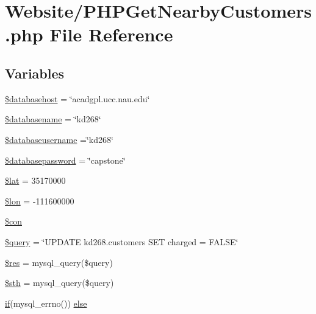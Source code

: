 \hypertarget{_p_h_p_get_nearby_customers_8php}{\section{Website/\-P\-H\-P\-Get\-Nearby\-Customers.php File Reference}
\label{_p_h_p_get_nearby_customers_8php}
}
\subsection*{Variables}
\begin{DoxyCompactItemize}
\item 
\hyperlink{_p_h_p_get_nearby_customers_8php_a034ead57b6864a4413371711e8d65372}{\$databasehost} = \char`\"{}acadgpl.\-ucc.\-nau.\-edu\char`\"{}
\item 
\hyperlink{_p_h_p_get_nearby_customers_8php_aace53f8afce81b52040cef0cd850138a}{\$databasename} = \char`\"{}kd268\char`\"{}
\item 
\hyperlink{_p_h_p_get_nearby_customers_8php_a251bf75f510d7c8b556c65d7c30e911f}{\$databaseusername} =\char`\"{}kd268\char`\"{}
\item 
\hyperlink{_p_h_p_get_nearby_customers_8php_a1a07536b6a5f43f2d8f826bd2ee6c91a}{\$databasepassword} = \char`\"{}capstone\char`\"{}
\item 
\hyperlink{_p_h_p_get_nearby_customers_8php_af498b42b83afed4dfe0af05fd802776c}{\$lat} = 35170000
\item 
\hyperlink{_p_h_p_get_nearby_customers_8php_a03836509761c0935d0c55370b184ccd6}{\$lon} = -\/111600000
\item 
\hyperlink{_p_h_p_get_nearby_customers_8php_a0debe10448ec56a57b5509648408a549}{\$con}
\item 
\hyperlink{_p_h_p_get_nearby_customers_8php_af59a5f7cd609e592c41dc3643efd3c98}{\$query} = \char`\"{}U\-P\-D\-A\-T\-E kd268.\-customers S\-E\-T charged = F\-A\-L\-S\-E\char`\"{}
\item 
\hyperlink{_p_h_p_get_nearby_customers_8php_a49a8a4009b02e49717caa88b128affc5}{\$res} = mysql\-\_\-query(\$query)
\item 
\hyperlink{_p_h_p_get_nearby_customers_8php_afa9126f9664959c02795be300a135f93}{\$sth} = mysql\-\_\-query(\$query)
\item 
\hyperlink{_m_c_mhome_page_8php_a8dec719c1645067d1065f7f064d4b967}{if}(mysql\-\_\-errno()) \hyperlink{_p_h_p_get_nearby_customers_8php_acd5fe7f2086f786c96623b819503b734}{else}
\end{DoxyCompactItemize}


